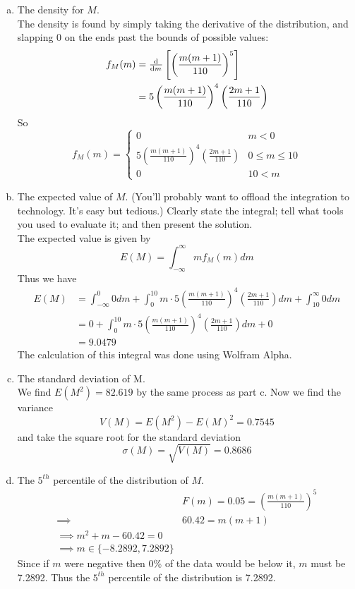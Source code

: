 \documentclass{scrartcl}
\begin{document}
\begin{enumerate}
\begin{enumerate}[a)]
\item The density for $M$.\\

The density is found by simply taking the derivative of the distribution, and slapping 0 on the ends past the bounds of possible values:
\begin{align*}
  f_M(m) &= \od{}{m}\left[\left(\frac{m(m+1)}{110}\right)^5\right]\\
  &= 5\left(\frac{m(m+1)}{110}\right)^4\left(\frac{2m+1}{110}\right)
\end{align*}
So
\begin{displaymath}
  f_M(m) = 
  \begin{cases}
    0 & m < 0\\
    5\left(\frac{m(m+1)}{110}\right)^4\left(\frac{2m+1}{110}\right) & 0 \le m \le 10\\
    0 & 10 < m
  \end{cases}
\end{displaymath}

\item The expected value of $M$. (You’ll probably want to offload the integration to technology. It’s easy but tedious.) Clearly state the integral; tell what tools you used to evaluate it; and then present the solution.\\

The expected value is given by $$E(M) = \int_{-\infty}^{\infty}mf_M(m)dm$$ Thus we have
\begin{align*}
  E(M) &= \int_{-\infty}^0 0 dm + \int_0^{10}m\cdot5\left(\frac{m(m+1)}{110}\right)^4\left(\frac{2m+1}{110}\right)dm + \int_{10}^{\infty}0dm\\
  &= 0 + \int_0^{10}m\cdot5\left(\frac{m(m+1)}{110}\right)^4\left(\frac{2m+1}{110}\right)dm + 0\\
  &= 9.0479
\end{align*}
The calculation of this integral was done using Wolfram Alpha.

\item The standard deviation of M.\\
  We find $E(M^2) = 82.619$ by the same process as part c. Now we find the variance
$$V(M) = E(M^2) - E(M)^2 = 0.7545$$
and take the square root for the standard deviation
$$\sigma(M) = \sqrt{V(M)} = 0.8686$$

\item The $5^{th}$ percentile of the distribution of $M$.\\
\begin{align*}
  & F(m) = 0.05 = \left(\frac{m(m+1)}{110}\right)^5\\
  \implies& 60.42 = m(m+1)\\
  \implies m^2 + m - 60.42 = 0\\
  \implies m\in\{-8.2892, 7.2892\}
\end{align*}
Since if $m$ were negative then 0\% of the data would be below it, $m$ must be 7.2892. Thus the $5^{th}$ percentile of the distribution is 7.2892.


\end{enumerate}
\end{enumerate}
\end{document}
